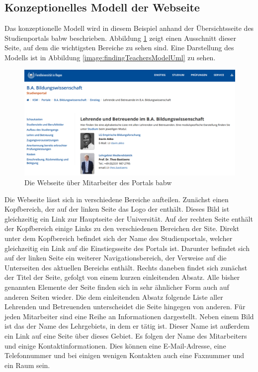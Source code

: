 \subsection{Konzeptionelles Modell der Webseite}
    \label{section:findingsTeachersConceptualModel}
    Das konzeptionelle Modell wird in diesem Beispiel anhand
    der Übersichtsseite des Studienportals \gls{babw} beschrieben.
    Abbildung \ref{image:findingTeachersModelOverview} zeigt einen
    Ausschnitt dieser Seite, auf dem die wichtigsten Bereiche zu sehen sind.
    Eine Darstellung des Modells ist in Abbildung
    \ref{image:findingTeachersModelUml} zu sehen.

    \begin{figure}[htb]
        \centering
        \includegraphics[width=\textwidth]{../resources/findings/case-study-1/model/overview.png}
        \caption{Die Webseite über Mitarbeiter des Portals \acrshort{babw}}
        \label{image:findingTeachersModelOverview}
    \end{figure}

    Die Webseite lässt sich in verschiedene Bereiche aufteilen.
    Zunächst einen Kopfbereich, der auf der linken Seite das Logo
    der {\fernUni} enthält.
    Dieses Bild ist gleichzeitig ein Link zur Hauptseite der Universität. 
    Auf der rechten Seite enthält der Kopfbereich einige Links zu den verschiedenen
    Bereichen der Site.
    Direkt unter dem Kopfbereich befindet sich der Name des Studienportals,
    welcher gleichzeitig ein Link auf die Einstiegsseite des Portals ist.
    Darunter befindet sich auf der linken Seite ein weiterer Navigationsbereich,
    der Verweise auf die Unterseiten des aktuellen Bereichs enthält.
    Rechts daneben findet sich zunächst der Titel der Seite,
    gefolgt von einem kurzen einleitenden Absatz.
    Alle bisher genannten Elemente der Seite finden sich in sehr ähnlicher Form
    auch auf anderen Seiten wieder.
    Die dem einleitenden Absatz folgende Liste aller Lehrenden und Betreuenden unterscheidet die Seite hingegen von anderen.
    Für jeden Mitarbeiter sind eine Reihe an Informationen dargestellt.
    Neben einem Bild ist das der Name des Lehrgebiets, in dem er tätig ist.
    Dieser Name ist außerdem ein Link auf eine Seite über dieses Gebiet.
    Es folgen der Name des Mitarbeiters
    und einige Kontaktinformationen.
    Dies können eine E-Mail-Adresse, eine Telefonnummer
    und bei einigen wenigen Kontakten auch eine Faxnummer und ein Raum sein.

